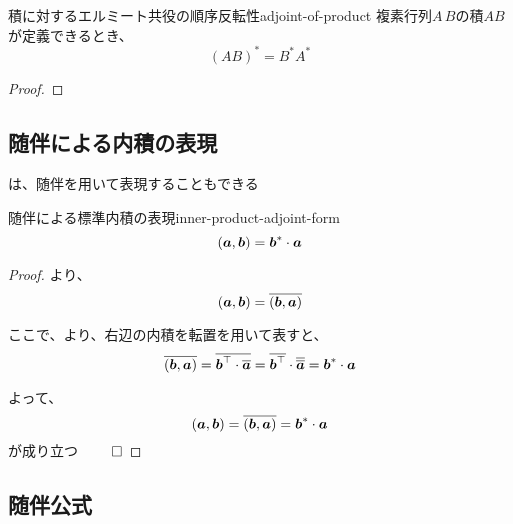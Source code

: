 \documentclass[../../../topic_linear-algebra]{subfiles}
\begin{document}
\br

\begin{theorem}{積に対するエルミート共役の順序反転性}{adjoint-of-product}
  複素行列$A\,B$の積$AB$が定義できるとき、
  \begin{equation*}
    (AB)^* = B^* A^*
  \end{equation*}
\end{theorem}

\begin{proof}
  \todo{}
\end{proof}

\subsection{随伴による内積の表現}

は、随伴を用いて表現することもできる

\begin{theorem}{随伴による標準内積の表現}{inner-product-adjoint-form}
  \begin{equation*}
    (\vb*{a},\vb*{b}) = \vb*{b}^* \cdot \vb*{a}
  \end{equation*}
\end{theorem}

\begin{proof}
  より、
  \begin{equation*}
    (\vb*{a},\vb*{b}) = \overline{(\vb*{b},\vb*{a})}
  \end{equation*}

  ここで、より、右辺の内積を転置を用いて表すと、
  \begin{equation*}
    \overline{(\vb*{b},\vb*{a})} = \overline{\vb*{b}^\top \cdot \overline{\vb*{a}}} = \overline{\vb*{b}^\top} \cdot \overline{\overline{\vb*{a}}} = \vb*{b}^* \cdot \vb*{a}
  \end{equation*}

  よって、
  \begin{equation*}
    (\vb*{a},\vb*{b}) = \overline{(\vb*{b},\vb*{a})} = \vb*{b}^* \cdot \vb*{a}
  \end{equation*}
  が成り立つ $\qed$
\end{proof}

\subsection{随伴公式}
\end{document}
